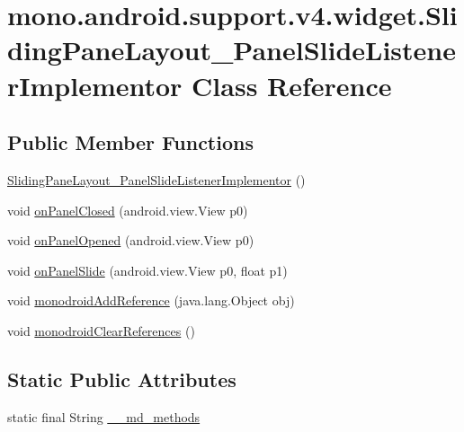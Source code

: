 \hypertarget{classmono_1_1android_1_1support_1_1v4_1_1widget_1_1_sliding_pane_layout___panel_slide_listener_implementor}{
\section{mono.android.support.v4.widget.SlidingPaneLayout\_\-PanelSlideListenerImplementor Class Reference}
\label{classmono_1_1android_1_1support_1_1v4_1_1widget_1_1_sliding_pane_layout___panel_slide_listener_implementor}
}
\subsection*{Public Member Functions}
\begin{CompactItemize}
\item 
\hyperlink{classmono_1_1android_1_1support_1_1v4_1_1widget_1_1_sliding_pane_layout___panel_slide_listener_implementor_1257a81a2b4b823556f4de59f0bfef30}{SlidingPaneLayout\_\-PanelSlideListenerImplementor} ()
\item 
void \hyperlink{classmono_1_1android_1_1support_1_1v4_1_1widget_1_1_sliding_pane_layout___panel_slide_listener_implementor_c67d9d5a90774b5efb156d8847f9688b}{onPanelClosed} (android.view.View p0)
\item 
void \hyperlink{classmono_1_1android_1_1support_1_1v4_1_1widget_1_1_sliding_pane_layout___panel_slide_listener_implementor_1ad453041f4b5cc0b2d3fc3b3cbe5877}{onPanelOpened} (android.view.View p0)
\item 
void \hyperlink{classmono_1_1android_1_1support_1_1v4_1_1widget_1_1_sliding_pane_layout___panel_slide_listener_implementor_d81fc29a48a7c9f5d5ae39c3eb014113}{onPanelSlide} (android.view.View p0, float p1)
\item 
void \hyperlink{classmono_1_1android_1_1support_1_1v4_1_1widget_1_1_sliding_pane_layout___panel_slide_listener_implementor_795110192f8a7aea8421ef11b0b38ce1}{monodroidAddReference} (java.lang.Object obj)
\item 
void \hyperlink{classmono_1_1android_1_1support_1_1v4_1_1widget_1_1_sliding_pane_layout___panel_slide_listener_implementor_21c4ba3dde4c1cad8f802c89642934da}{monodroidClearReferences} ()
\end{CompactItemize}
\subsection*{Static Public Attributes}
\begin{CompactItemize}
\item 
static final String \hyperlink{classmono_1_1android_1_1support_1_1v4_1_1widget_1_1_sliding_pane_layout___panel_slide_listener_implementor_f5c07052b8f832c32fcbb060679961a9}{\_\-\_\-md\_\-methods}
\end{CompactItemize}
